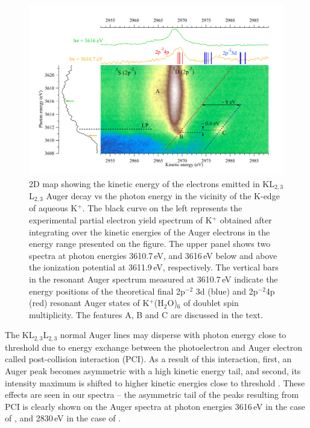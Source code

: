 \begin{figure}[h!]
\centering
\includegraphics[scale=0.55]{figures/k_2dmap.pdf}
\caption{2D map showing the kinetic energy of the electrons emitted in KL$_{2,3}$L$_{2,3}$ Auger decay vs the photon energy in the vicinity of the K-edge of aqueous K$^{+}$. The black curve on the left represents the experimental partial electron yield spectrum of K$^{+}$ obtained after integrating over the kinetic energies of the Auger electrons in the energy range presented on the figure. The upper panel shows two spectra at photon energies 3610.7\,eV, and 3616\,eV below and above the ionization potential at 3611.9\,eV, respectively. The vertical bars in the resonant Auger spectrum measured at 3610.7\,eV indicate the energy positions of the theoretical final 2p$^{-2}$ 3d (blue) and 2p$^{-2}$4p (red) resonant Auger states of K$^{+}$(H$_2$O)$_6$ of doublet spin multiplicity. The features A, B and C are discussed in the text.}
\label{fg:2dmap_k}
\end{figure}



The KL$_{2,3}$L$_{2,3}$ normal Auger lines may disperse with photon energy close to threshold due to energy exchange between the photoelectron and Auger electron called post-collision interaction (PCI). As a result of this interaction, first, an Auger peak becomes asymmetric with a high kinetic energy tail, and second, its intensity maximum is shifted to higher kinetic energies close to threshold \citep{russek86:911,guillemin15:012503}. These effects are seen in our spectra -- the asymmetric tail of the peaks resulting from PCI is clearly shown on the Auger spectra at photon energies 3616\,eV in the case of \ki, and 2830\,eV in the case of \cli.



